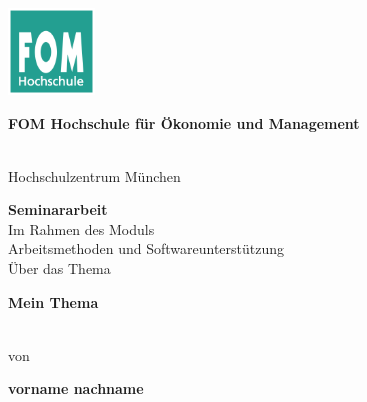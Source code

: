 \newcommand{\Thema}{Mein Thema}
\newcommand{\Name}{vorname nachname}
\newcommand{\Gutachter}{Dozent}
\newcommand{\Matrikelnummer}{123456}
\newcommand{\Abgabedatum}{01.01.2000}




\begin{titlepage}
	\begin{center}
		\includegraphics[width=2.3cm]{assets/fomLogo.pdf}\\
		\vspace{.5cm}
		\begin{Large}\textbf{FOM Hochschule für Ökonomie und Management}\end{Large}\\
		\vspace{.5cm}
		Hochschulzentrum München
																		
		\vspace{2cm}
	\end{center}
																						
	\bigskip	
																																														
	\begin{center}
		\textbf{Seminararbeit}\\
		\vspace{0.2cm}
		Im Rahmen des Moduls\\
		\vspace{0.5cm}
		Arbeitsmethoden und Softwareunterstützung\\
		\vspace{2cm}
		Über das Thema\\
		\vspace{0.5cm}
		\begin{Large}\textbf{\textbf{\Thema}}\end{Large}\\
																
		\vspace{2cm}
		von\\
		\vspace{0.5cm}
		\begin{Large}\textbf{\textbf{\Name}}\end{Large}\\
	\end{center}
																				

\end{titlepage}
